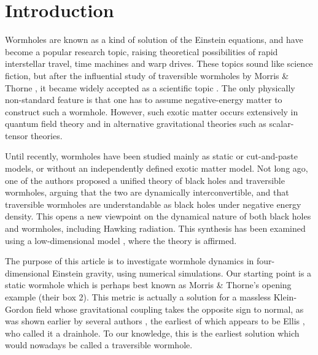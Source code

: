 \documentclass[aps,showpacs,twocolumn,draft,eqsecnum]{revtex4}
\begin{document}
\maketitle
\section{Introduction}

Wormholes are known as a kind of solution of the Einstein equations, and have
become a popular research topic, raising theoretical possibilities of rapid
interstellar travel, time machines and warp drives. These topics sound like
science fiction, but after the influential study of traversible wormholes by
Morris \& Thorne \cite{MT}, it became widely accepted as a scientific topic
\cite{MVbook}. The only physically non-standard feature is that one has to
assume negative-energy matter to construct such a wormhole. However, such
exotic matter occurs extensively in quantum field theory and in alternative
gravitational theories such as scalar-tensor theories.

Until recently, wormholes have been studied mainly as static or cut-and-paste
models, or without an independently defined exotic matter model. Not long ago,
one of the authors \cite{wh} proposed a unified theory of black holes and
traversible wormholes, arguing that the two are dynamically interconvertible,
and that traversible wormholes are understandable as black holes under negative
energy density. This opens a new viewpoint on the dynamical nature of both
black holes and wormholes, including Hawking radiation. This synthesis has been
examined using a low-dimensional model \cite{HKL}, where the theory is
affirmed.

The purpose of this article is to investigate wormhole dynamics in
four-dimensional Einstein gravity, using numerical simulations. Our starting
point is a static wormhole which is perhaps best known as Morris \& Thorne's
opening example (their box 2). This metric is actually a solution for a
massless Klein-Gordon field whose gravitational coupling takes the opposite
sign to normal, as was shown earlier by several authors \cite{Cl}, the earliest
of which appears to be Ellis \cite{E}, who called it a drainhole. To our
knowledge, this is the earliest solution which would nowadays be called a
traversible wormhole.
\end{document}
